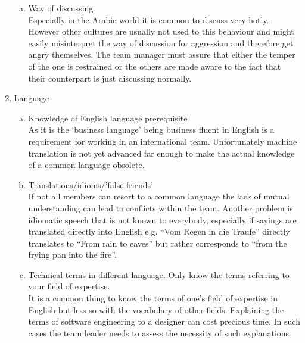 \begin{multicols}{2}
\begin{enumerate}[1.]
\begin{enumerate}[a)]
		  	\item Way of discussing \\ Especially in the Arabic world it is common to discuss very hotly. However other cultures are usually not used to this behaviour and might easily misinterpret the way of discussion for aggression and therefore get angry themselves. The team  manager must assure that either the temper of the one is restrained or the others are made aware to the fact that their counterpart is just discussing normally.
		\end{enumerate}
\item Language
		\begin{enumerate}[a)]
		  \item Knowledge of English language prerequisite \\
As it is the ‘business language’ being business fluent in English is a requirement for working in an international team. Unfortunately machine translation is not yet advanced far enough to make the actual knowledge of a common language obsolete.
		  \item Translations/idioms/’false friends’\\
If not all members can resort to a common language the lack of mutual understanding can lead to conflicts within the team. Another problem is idiomatic speech that is not known to everybody, especially if sayings are translated directly into English e.g. “Vom Regen in die Traufe” directly translates to “From rain to eaves” but rather corresponds to “from the frying pan into the fire”.
		  \item Technical terms in different language. Only know the terms referring to your field of expertise. \\
It is a common thing to know the terms of one’s field of expertise in English but less so with the vocabulary of other fields. Explaining the terms of software engineering to a designer can cost precious time. In such cases the team leader needs to assess the necessity of such explanations.
		\end{enumerate}
\end{enumerate}
\end{multicols}
